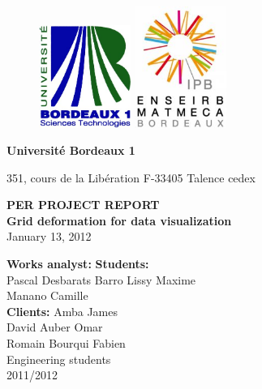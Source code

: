 \begin{titlepage}
  \begin {figure}[ht]
	\includegraphics[angle=0,width=3cm]{img/logobordeaux1.jpg}
        \hspace{11cm}
	\includegraphics[angle=0,width=3cm]{img/logo.jpg}
	\label{logo}
  \end {figure}
  \begin{flushleft}
    \textbf{Université Bordeaux 1}

    351, cours de la Libération 
    F-33405 Talence cedex 
    
  \end{flushleft}
  
  \vspace{4cm}
	\begin{center}
	  {\bf PER PROJECT REPORT}\\
	  \vspace{1cm}
		 {\LARGE\bf Grid deformation for data visualization}\\
\vspace{4cm}
           January 13, 2012

	\end{center}


        \vspace{4cm}
        \begin{flushleft}
	  \begin{tabbing}
		\textbf{Works analyst:}
		\hspace{8.5cm} \=\textbf{Students:} \\
                \noindent Pascal {\sc Desbarats}
		\> {\sc Barro} Lissy Maxime\\
                \> {\sc Manano} Camille\\
                \noindent \textbf{Clients:}
		 Amba James\\
                \noindent David {\sc Auber}
                 Omar\\
                \noindent Romain {\sc Bourqui}
                 Fabien\\[0.3 cm]
                \>Engineering students \\
                 2011/2012\\
	  \end{tabbing}
        \end{flushleft}


\end{titlepage}
